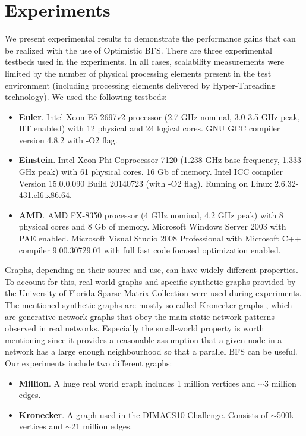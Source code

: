 \documentclass[letterpaper]{article}
\begin{document}
			
	\section{Experiments}\label{sec:expe} %
		We present experimental results to demonstrate the performance gains that can be realized with the use of Optimistic BFS.
		There are three experimental testbeds used in the experiments. 
		In all cases, scalability measurements were limited by the number of physical processing elements present in the test environment (including processing elements delivered by Hyper-Threading technology).
		We used the following testbeds:
		\begin{itemize}
			\item \textbf{Euler}. Intel Xeon E5-2697v2 processor (2.7 GHz nominal, 3.0-3.5 GHz peak, HT enabled) with 12 physical and 24 logical cores. GNU GCC compiler version 4.8.2 with -O2 flag. 
			\item \textbf{Einstein}. Intel Xeon Phi Coprocessor 7120 (1.238 GHz base frequency, 1.333 GHz peak) with 61 physical cores. 16 Gb of memory.
			Intel ICC compiler Version 15.0.0.090 Build 20140723 (with -O2 flag).
			Running on Linux 2.6.32-431.el6.x86.64.
			\item \textbf{AMD}. AMD FX-8350 processor (4 GHz nominal, 4.2 GHz peak) with 8 physical cores and 8 Gb of memory. Microsoft Windows Server 2003 with PAE enabled. Microsoft Visual Studio 2008 Professional with  Microsoft C++ compiler 9.00.30729.01 with full fast code focused optimization enabled.
		\end{itemize}

		Graphs, depending on their source and use, can have widely different properties.
		To account for this, real world graphs and specific synthetic graphs provided by the University of Florida Sparse Matrix Collection \cite{SparseMatrixCollection} were used during experiments.
		The mentioned synthetic graphs are mostly so called Kronecker graphs \cite{Leskovec:2010:KGA:1756006.1756039}, which are generative network graphs that obey the main static network patterns observed in real networks.
		Especially the small-world property is worth mentioning since it provides a reasonable assumption that a given node in a network has a large enough neighbourhood so that a parallel BFS can be useful.		
		Our experiments include two different graphs:
		\begin{itemize}
			\item \textbf{Million}. A huge real world graph includes 1 million vertices and $\sim$3 million edges.
			\item \textbf{Kronecker}. A graph used in the DIMACS10 Challenge. Consists of $\sim$500k vertices and $\sim$21 million edges.
		\end{itemize}
		
\end{document}
